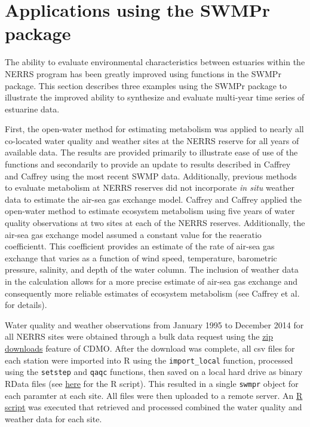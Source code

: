 \documentclass[10pt,letterpaper]{article}\usepackage[]{graphicx}\usepackage[]{color}
\begin{document}
\section*{Applications using the SWMPr package}

The ability to evaluate environmental characteristics between estuaries within the \ac{NERRS} program has been greatly improved using functions in the SWMPr package.  This section describes three examples using the SWMPr package to illustrate the improved ability to synthesize and evaluate multi-year time series of estuarine data.  

First, the open-water method for estimating metabolism was applied to nearly all co-located water quality and weather sites at the \ac{NERRS} reserve for all years of available data.  The results are provided primarily to illustrate ease of use of the functions and secondarily to provide an update to results described in Caffrey \cite{Caffrey03} and Caffrey \cite{Caffrey04} using the most recent \ac{SWMP} data.  Additionally, previous methods to evaluate metabolism at \ac{NERRS} reserves did not incorporate \textit{in situ} weather data to estimate the air-sea gas exchange model.  Caffrey \cite{Caffrey03} and Caffrey \cite{Caffrey04} applied the open-water method to estimate ecosystem metabolism using five years of water quality observations at two sites at each of the \ac{NERRS} reserves.  Additionally, the air-sea gas exchange model assumed a constant value for the reaeratio coefficientt.  This coefficient provides an estimate of the rate of air-sea gas exchange that varies as a function of wind speed, temperature, barometric pressure, salinity, and depth of the water column.  The inclusion of weather data in the calculation allows for a more precise estimate of air-sea gas exchange and consequently more reliable estimates of ecosystem metabolism (see Caffrey et al. \cite{Caffrey14} for details).

Water quality and weather observations from January 1995 to December 2014 for all \ac{NERRS} sites were obtained through a bulk data request using the \href{http://cdmo.baruch.sc.edu/aqs/zips.cfm}{zip downloads} feature of \ac{CDMO}.  After the download was complete, all csv files for each station were imported into R using the \texttt{import\_local} function, processed using the \texttt{setstep} and \texttt{qaqc} functions, then saved on a local hard drive as binary RData files (see \href{https://github.com/fawda123/swmp_rats/blob/master/R/dat_proc.R}{here} for the R script). This resulted in a single \texttt{swmpr} object for each paramter at each site.  All files were then uploaded to a remote server.  An \href{https://gist.github.com/fawda123/4fc51c2cb86341ed9291}{R script} was executed that retrieved and processed combined the water quality and weather data for each site. 
\end{document}
